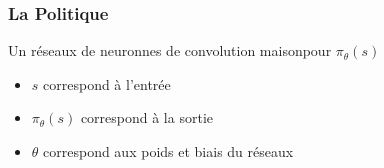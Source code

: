 \documentclass[8pt]{beamer}
\begin{document}
\begin{frame}[label=retourCNN]

  \frametitle{La Politique}

  \begin{block}{Un réseaux de neuronnes de convolution maison\footnotemark pour $\pi_{\theta}(s)$}
    \begin{itemize}
    \item $s$ correspond à l'entrée
    \item $\pi_{\theta}(s)$ correspond à la sortie
    \item $\theta$ correspond aux poids et biais du réseaux
    \end{itemize}

  \end{block}

  \begin{figure}
    

\end{figure}
\end{frame}
\end{document}
